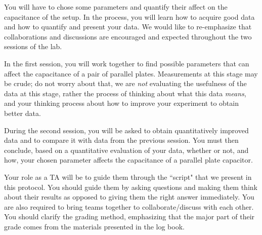 \documentclass[12pt]{report}
\begin{document}
You will have to chose some parameters and quantify their affect on the capacitance of the setup. In the process, you will learn how to acquire good data and how to quantify and present your data. We would like to re-emphasize that collaborations and discussions are encouraged and expected throughout the two sessions of the lab.

In the first session, you will work together to find possible parameters that can affect the capacitance of a pair of parallel plates. Measurements at this stage may be crude; do not worry about that, we are {\it not} evaluating the usefulness of the data at this stage, rather the process of thinking about what this data {\it means}, and your thinking process about how to improve your experiment to obtain better data.

During the second session, you will be asked to obtain quantitatively improved data and to compare it with data from the previous session. You must then conclude, based on a quantitative evaluation of your data, whether or not, and how, your chosen parameter affects the capacitance of a parallel plate capacitor. \\

\begin{tcolorbox}[title=Role as a TA]
Your role as a TA will be to guide them through the ``script" that we present in this protocol. You should guide them by asking questions and making them think about their results as opposed to giving them the right answer immediately. You are also required to bring teams together to collaborate/discuss with each other. You should clarify the grading method,  emphasizing that the major part of their grade comes from the materials presented in the log book.
\end{tcolorbox}
\end{document}
